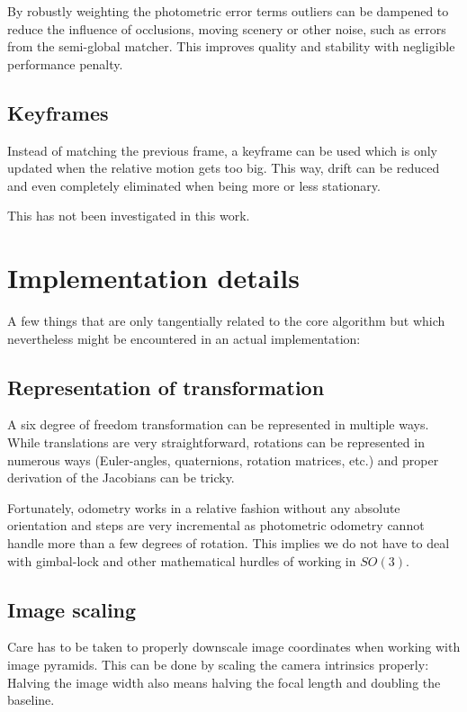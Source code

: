 By robustly weighting the photometric error terms outliers can be dampened to
reduce the influence of occlusions, moving scenery or other noise, such as
errors from the semi-global matcher. This improves quality and stability with
negligible performance penalty.

\subsection{Keyframes}

Instead of matching the previous frame, a keyframe can be used which is only
updated when the relative motion gets too big. This way, drift can be reduced
and even completely eliminated when being more or less stationary.

This has not been investigated in this work.




\section{Implementation details}

A few things that are only tangentially related to the core algorithm but which
nevertheless might be encountered in an actual implementation:

\subsection{Representation of transformation}

A six degree of freedom transformation can be represented in multiple ways.
While translations are very straightforward, rotations can be represented in
numerous ways (Euler-angles, quaternions, rotation matrices, etc.) and proper
derivation of the Jacobians can be tricky.

Fortunately, odometry works in a relative fashion without any absolute
orientation and steps are very incremental as photometric odometry cannot
handle more than a few degrees of rotation. This implies we do not have to deal
with gimbal-lock and other mathematical hurdles of working in $SO(3)$.

\subsection{Image scaling}

Care has to be taken to properly downscale image coordinates when working with
image pyramids. This can be done by scaling the camera intrinsics properly:
Halving the image width also means halving the focal length and doubling the
baseline.

